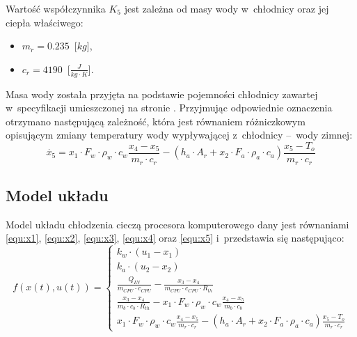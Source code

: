 Wartość współczynnika $K_5$ jest zależna od masy wody w~chłodnicy oraz jej
ciepła właściwego:
\begin{itemize}
    \item $m_r = 0.235$~[$kg$],
    \item $c_r = 4190$~[$\frac{J}{kg \cdot K}$].
\end{itemize}
Masa wody została przyjęta na podstawie pojemności chłodnicy zawartej
w~specyfikacji umieszczonej na stronie \cite{EKWBradiator}. Przyjmując
odpowiednie oznaczenia otrzymano następującą zależność, która jest równaniem
różniczkowym opisującym zmiany temperatury wody wypływającej z~chłodnicy --~wody
zimnej:
\begin{equation}
    \dot{x_5} = x_1 \cdot F_w \cdot \rho_w \cdot c_w \frac{x_4 - x_5}{m_r \cdot
    c_r} - \left( h_a \cdot A_r + x_2 \cdot F_a \cdot \rho_a \cdot c_a \right)
    \frac{x_5 - T_o}{m_r \cdot c_r}
    \label{equ:x5}
\end{equation}

\subsection{Model układu}
\indent

Model układu chłodzenia cieczą procesora komputerowego dany jest równaniami
\eqref{equ:x1}, \eqref{equ:x2}, \eqref{equ:x3}, \eqref{equ:x4} oraz
\eqref{equ:x5} i~przedstawia się następująco:
\begin{equation}
    f\left( x\left( t \right), u\left( t \right) \right) =
    \begin{cases}
        k_w \cdot \left( u_1 - x_1 \right)\\
        k_a \cdot \left( u_2 - x_2 \right)\\
        \frac{Q_{IN}}{m_{CPU} \cdot c_{CPU}} - \frac{x_3 - x_4}{m_{CPU} \cdot
        c_{CPU} \cdot R_{th}}\\
        \frac{x_3 - x_4}{m_b \cdot c_b \cdot R_{th}} - x_1 \cdot F_w \cdot
        \rho_w \cdot c_w \frac{x_4 - x_5}{m_b \cdot c_b}\\
        x_1 \cdot F_w \cdot \rho_w \cdot c_w \frac{x_4 - x_5}{m_r \cdot c_r} -
        \left( h_a \cdot A_r + x_2 \cdot F_a \cdot \rho_a \cdot c_a \right)
        \frac{x_5 - T_o}{m_r \cdot c_r}
    \end{cases}
    \label{equ:model}
\end{equation}
